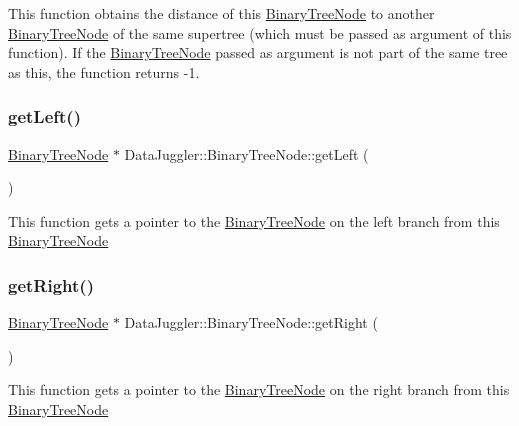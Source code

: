 This function obtains the distance of this \hyperlink{classDataJuggler_1_1BinaryTreeNode}{Binary\+Tree\+Node} to another \hyperlink{classDataJuggler_1_1BinaryTreeNode}{Binary\+Tree\+Node} of the same supertree (which must be passed as argument of this function). If the \hyperlink{classDataJuggler_1_1BinaryTreeNode}{Binary\+Tree\+Node} passed as argument is not part of the same tree as this, the function returns -\/1. \mbox{\label{classDataJuggler_1_1BinaryTreeNode_a9c7bf23457f5a2a39a6b7e5525604e68}} 
\subsubsection{\texorpdfstring{get\+Left()}{getLeft()}}
{\footnotesize\ttfamily \hyperlink{classDataJuggler_1_1BinaryTreeNode}{Binary\+Tree\+Node} $\ast$ Data\+Juggler\+::\+Binary\+Tree\+Node\+::get\+Left (\begin{DoxyParamCaption}{ }\end{DoxyParamCaption})}

This function gets a pointer to the \hyperlink{classDataJuggler_1_1BinaryTreeNode}{Binary\+Tree\+Node} on the left branch from this \hyperlink{classDataJuggler_1_1BinaryTreeNode}{Binary\+Tree\+Node} \mbox{\label{classDataJuggler_1_1BinaryTreeNode_a0d7d9c5d8cd5033e12f78dfbcb9667a1}} 
\subsubsection{\texorpdfstring{get\+Right()}{getRight()}}
{\footnotesize\ttfamily \hyperlink{classDataJuggler_1_1BinaryTreeNode}{Binary\+Tree\+Node} $\ast$ Data\+Juggler\+::\+Binary\+Tree\+Node\+::get\+Right (\begin{DoxyParamCaption}{ }\end{DoxyParamCaption})}

This function gets a pointer to the \hyperlink{classDataJuggler_1_1BinaryTreeNode}{Binary\+Tree\+Node} on the right branch from this \hyperlink{classDataJuggler_1_1BinaryTreeNode}{Binary\+Tree\+Node} \mbox{\label{classDataJuggler_1_1BinaryTreeNode_a257b78d609886933af1ceabb8c5880b0}} 
